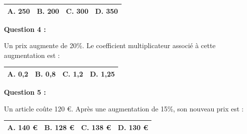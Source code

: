 \documentclass[12pt,a4paper]{article}
\begin{document}
\renewcommand{\arraystretch}{3}
\begin{tabular}{|m{3.4cm}|m{3.4cm}|m{3.4cm}|m{3.4cm}|}
\hline
\centering \vspace{-0.3cm} \textbf{A.} 250 & 
\centering \vspace{-0.3cm} \textbf{B.} 200 & 
\centering \vspace{-0.3cm} \textbf{C.} 300 & 
\centering \vspace{-0.3cm} \textbf{D.} 350 \tabularnewline
\hline
\end{tabular}

\vspace{0.7cm}

\textbf{Question 4 :}
\vspace{5pt}

Un prix augmente de 20\%. Le coefficient multiplicateur associé à cette augmentation est :

\vspace{0.3cm}

\renewcommand{\arraystretch}{3}
\begin{tabular}{|m{3.4cm}|m{3.4cm}|m{3.4cm}|m{3.4cm}|}
\hline
\centering \vspace{-0.3cm} \textbf{A.} 0,2 & 
\centering \vspace{-0.3cm} \textbf{B.} 0,8 & 
\centering \vspace{-0.3cm} \textbf{C.} 1,2 & 
\centering \vspace{-0.3cm} \textbf{D.} 1,25 \tabularnewline
\hline
\end{tabular}

\vspace{0.7cm}

\textbf{Question 5 :}
\vspace{5pt}

Un article coûte 120 €. Après une augmentation de 15\%, son nouveau prix est :
\vspace{0.3cm}

\renewcommand{\arraystretch}{3}
\begin{tabular}{|m{3.4cm}|m{3.4cm}|m{3.4cm}|m{3.4cm}|}
\hline
\centering \vspace{-0.3cm} \textbf{A.} 140 € & 
\centering \vspace{-0.3cm} \textbf{B.} 128 € & 
\centering \vspace{-0.3cm} \textbf{C.} 138 € & 
\centering \vspace{-0.3cm} \textbf{D.} 130 € \tabularnewline
\hline
\end{tabular}
\end{document}
